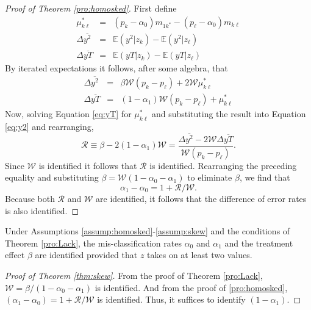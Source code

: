 \begin{proof}[Proof of Theorem \ref{pro:homosked}]
  First define
  \begin{eqnarray}
    \label{eq:mustar}
    \mu_{k\ell}^* &=&  (p_k - \alpha_0) m_{1k^*} - (p_{\ell}-\alpha_0)m_{k\ell} \\
    \label{eq:y2def}
    \Delta\overline{y^2} &=&  \mathbb{E}(y^2|z_k) - \mathbb{E}(y^2|z_\ell)\\
    \label{eq:yTdef}
    \Delta\overline{yT} &=&  \mathbb{E}(yT|z_k) - \mathbb{E}(yT|z_\ell)
  \end{eqnarray}
  By iterated expectations it follows, after some algebra, that
  \begin{eqnarray}
    \label{eq:y2}
    \Delta\overline{y^2} &=& \beta \mathcal{W} (p_k - p_\ell)  + 2 \mathcal{W} \mu_{k\ell}^* \\
    \label{eq:yT}
    \Delta\overline{yT} &=& (1-\alpha_1)\mathcal{W}(p_k - p_\ell) + \mu_{k\ell}^* 
  \end{eqnarray}
  Now, solving Equation \ref{eq:yT} for $\mu_{k\ell}^*$ and substituting the result into Equation \ref{eq:y2} and rearranging,
  \begin{equation}
    \mathcal{R} \equiv \beta - 2(1-\alpha_1)\mathcal{W} = \frac{\Delta\overline{y^2} - 2 \mathcal{W}\Delta\overline{yT}}{\mathcal{W}(p_k - p_\ell)}.
    \label{eq:Rdef}
  \end{equation}
  Since $\mathcal{W}$ is identified it follows that $\mathcal{R}$ is identified.
  Rearranging the preceding equality and substituting $\beta=\mathcal{W}(1-\alpha_0 -\alpha_1)$ to eliminate $\beta$, we find that
  \begin{equation}
    \alpha_1 - \alpha_0 = 1 + \mathcal{R}/\mathcal{W}.
   \label{eq:aDiff}
  \end{equation}
  Because both $\mathcal{R}$ and $\mathcal{W}$ are identified, it follows that the difference of error rates is also identified.
\end{proof}

\begin{thm}
  \label{thm:skew}
  Under Assumptions \ref{assump:homosked}-\ref{assump:skew} and the conditions of Theorem \ref{pro:Lack}, the mis-classification rates $\alpha_0$ and $\alpha_1$ and the treatment effect $\beta$ are identified provided that $z$ takes on at least two values.
\end{thm}

\begin{proof}[Proof of Theorem \ref{thm:skew}]
  From the proof of Theorem \ref{pro:Lack}, $\mathcal{W} = \beta/(1-\alpha_0 - \alpha_1)$ is identified. 
  And from the proof of \ref{pro:homosked}, $(\alpha_1 - \alpha_0) = 1 + \mathcal{R}/\mathcal{W}$ is identified.
  Thus, it suffices to identify $(1-\alpha_1)$. 
\end{proof}
